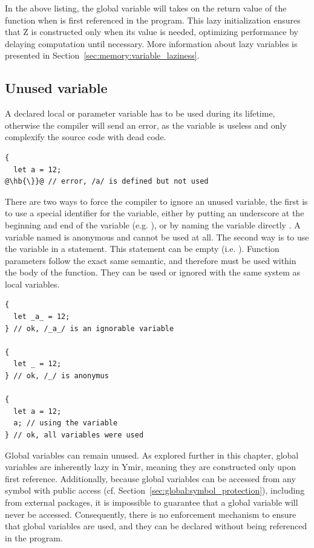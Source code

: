 In the above listing, the global variable  will takes on the return
value of the function  when  is first referenced in the
program. This lazy initialization ensures that Z is constructed only when its
value is needed, optimizing performance by delaying computation until necessary.
More information about lazy variables is presented in
Section~\ref{sec:memory:variable_laziness}.

\subsection{Unused variable}
\label{sec:memory:unused_variables}

A declared local or parameter variable has to be used during its lifetime,
otherwise the compiler will send an error, as the variable is useless and only
complexify the source code with dead code.

\begin{lstlisting}[style=coloredverbatimError, escapechar=@]
{
  let a = 12;
@\hb{\}}@ // error, /a/ is defined but not used
\end{lstlisting}

There are two ways to force the compiler to ignore an unused variable, the first
is to use a special identifier for the variable, either by putting an underscore
at the beginning and end of the variable (e.g. ), or by naming the
variable directly \token{\_}. A variable named \token{\_} is anonymous and
cannot be used at all. The second way is to use the variable in a statement.
This statement can be empty (i.e. ). Function parameters follow the
exact same semantic, and therefore must be used within the body of the function.
They can be used or ignored with the same system as local variables.

\begin{lstlisting}[style=coloredverbatim, escapechar=@]
{
  let _a_ = 12;
} // ok, /_a_/ is an ignorable variable

{
  let _ = 12;
} // ok, /_/ is anonymus

{
  let a = 12;
  a; // using the variable
} // ok, all variables were used
\end{lstlisting}

Global variables can remain unused. As explored further in this chapter, global
variables are inherently lazy in Ymir, meaning they are constructed only upon
first reference. Additionally, because global variables can be accessed from any
symbol with public access (cf. Section~\ref{sec:global:symbol_protection}), including
from external packages, it is impossible to guarantee that a global variable
will never be accessed. Consequently, there is no enforcement mechanism to
ensure that global variables are used, and they can be declared without being
referenced in the program.

